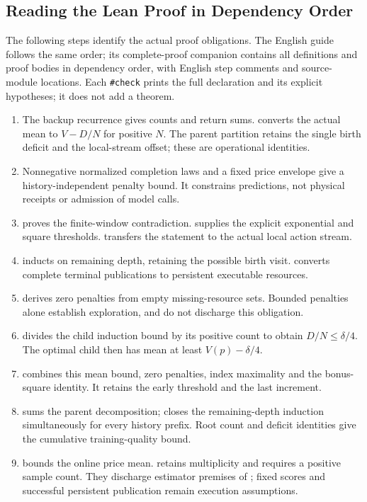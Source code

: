 \subsection{Reading the Lean Proof in Dependency Order}
The following steps identify the actual proof obligations. The English guide
 follows the same order; its
complete-proof companion 
contains all definitions and proof bodies in dependency order, with English
step comments and source-module locations.
Each \texttt{\#check} prints the full declaration and its explicit hypotheses;
it does not add a theorem.
\begin{enumerate}
\item The backup recurrence gives counts and return sums.
 converts the actual mean to $V-D/N$ for
positive $N$. The parent partition retains the single birth deficit and
the local-stream offset; these are operational identities.
\item Nonnegative normalized completion laws and a fixed price envelope give
a history-independent penalty bound. It constrains predictions, not
physical receipts or admission of model calls.
\item {} proves the finite-window contradiction.
 supplies the explicit exponential
and square thresholds.  transfers the
statement to the actual local action stream.
\item {} inducts on remaining depth, retaining
the possible birth visit.  converts
complete terminal publications to persistent executable resources.
\item {} derives zero penalties
from empty missing-resource sets. Bounded penalties alone establish
exploration, and do not discharge this obligation.
\item {} divides the child induction bound
by its positive count to obtain $D/N\le\delta/4$. The optimal child then
has mean at least $V(p)-\delta/4$.
\item {} combines this mean bound,
zero penalties, index maximality and the bonus-square identity. It retains
the early threshold and the last increment.
\item {} sums the parent decomposition;
 closes the remaining-depth induction
simultaneously for every history prefix. Root count and deficit identities
give the cumulative training-quality bound.
\item {} bounds the online price mean.
 retains multiplicity and requires a positive
sample count. They discharge estimator premises of
; fixed scores and successful
persistent publication remain execution assumptions.
\end{enumerate}


